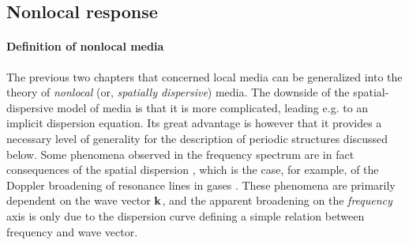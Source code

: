 
\subsection{Nonlocal response} 
\paragraph{Definition of nonlocal media}%
The previous two chapters that concerned local media can be generalized into the theory of \textit{nonlocal} (or, \textit{spatially dispersive}) media.  The downside of the spatial-dispersive model of media is that it is more complicated, leading e.g. to an implicit dispersion equation. Its great advantage is however that it provides a necessary level of generality for the description of periodic structures discussed below. 
Some phenomena observed in the frequency spectrum are in fact consequences of the spatial dispersion \cite[p. 359]{landau1984electrodynamics}, which is the case, for example, of the Doppler broadening of resonance lines in gases \cite{makarov2004permittivity}. 
These phenomena are primarily dependent on the wave vector ${\mathbf{k}}$, and the apparent broadening on the \textit{frequency} axis is only due to the dispersion curve defining a simple relation between  frequency and wave vector.  

